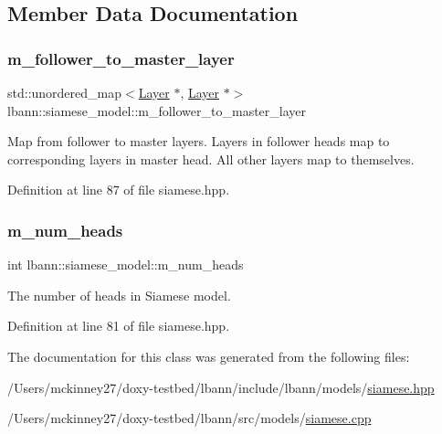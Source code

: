 \subsection{Member Data Documentation}
\mbox{\label{classlbann_1_1siamese__model_aae7af40b4a2db59082cd4c9149a1affd}} 
\subsubsection{\texorpdfstring{m\+\_\+follower\+\_\+to\+\_\+master\+\_\+layer}{m\_follower\_to\_master\_layer}}
{\footnotesize\ttfamily std\+::unordered\+\_\+map$<$\hyperlink{classlbann_1_1Layer}{Layer} $\ast$, \hyperlink{classlbann_1_1Layer}{Layer} $\ast$$>$ lbann\+::siamese\+\_\+model\+::m\+\_\+follower\+\_\+to\+\_\+master\+\_\+layer\hspace{0.3cm}{\ttfamily [private]}}

Map from follower to master layers. Layers in follower heads map to corresponding layers in master head. All other layers map to themselves. 

Definition at line 87 of file siamese.\+hpp.

\mbox{\label{classlbann_1_1siamese__model_ad0d7ba3cf40120b4f8e32675c5e9b3db}} 
\subsubsection{\texorpdfstring{m\+\_\+num\+\_\+heads}{m\_num\_heads}}
{\footnotesize\ttfamily int lbann\+::siamese\+\_\+model\+::m\+\_\+num\+\_\+heads\hspace{0.3cm}{\ttfamily [private]}}

The number of heads in Siamese model. 

Definition at line 81 of file siamese.\+hpp.



The documentation for this class was generated from the following files\+:\begin{DoxyCompactItemize}
\item 
/\+Users/mckinney27/doxy-\/testbed/lbann/include/lbann/models/\hyperlink{siamese_8hpp}{siamese.\+hpp}\item 
/\+Users/mckinney27/doxy-\/testbed/lbann/src/models/\hyperlink{siamese_8cpp}{siamese.\+cpp}\end{DoxyCompactItemize}
